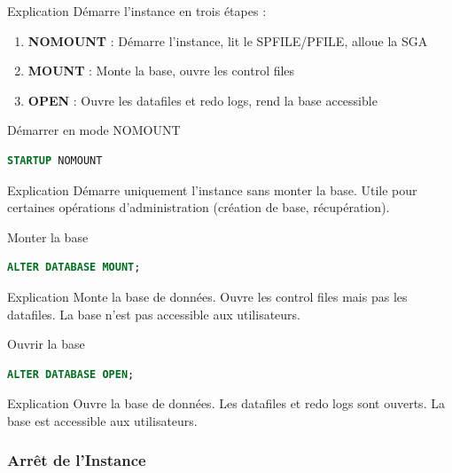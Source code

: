 \documentclass[12pt,a4paper]{article}
\begin{document}
\begin{explication}{Explication}
Démarre l'instance en trois étapes :
\begin{enumerate}
    \item \textbf{NOMOUNT} : Démarre l'instance, lit le SPFILE/PFILE, alloue la SGA
    \item \textbf{MOUNT} : Monte la base, ouvre les control files
    \item \textbf{OPEN} : Ouvre les datafiles et redo logs, rend la base accessible
\end{enumerate}
\end{explication}

\begin{commande}{Démarrer en mode NOMOUNT}
\begin{lstlisting}[language=SQL]
STARTUP NOMOUNT
\end{lstlisting}
\end{commande}

\begin{explication}{Explication}
Démarre uniquement l'instance sans monter la base. Utile pour certaines opérations d'administration (création de base, récupération).
\end{explication}

\begin{commande}{Monter la base}
\begin{lstlisting}[language=SQL]
ALTER DATABASE MOUNT;
\end{lstlisting}
\end{commande}

\begin{explication}{Explication}
Monte la base de données. Ouvre les control files mais pas les datafiles. La base n'est pas accessible aux utilisateurs.
\end{explication}

\begin{commande}{Ouvrir la base}
\begin{lstlisting}[language=SQL]
ALTER DATABASE OPEN;
\end{lstlisting}
\end{commande}

\begin{explication}{Explication}
Ouvre la base de données. Les datafiles et redo logs sont ouverts. La base est accessible aux utilisateurs.
\end{explication}

\subsubsection{Arrêt de l'Instance}
\end{document}
